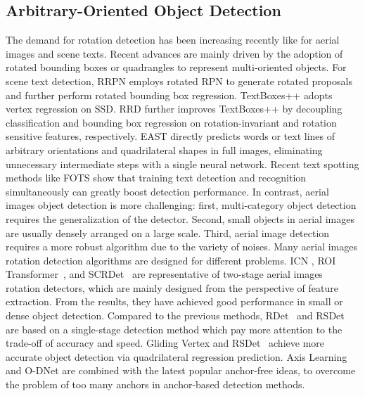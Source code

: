 \documentclass[10pt,journal,compsoc]{IEEEtran}
\begin{document}
\subsection{Arbitrary-Oriented Object Detection}
The demand for rotation detection has been increasing recently like for aerial images and scene texts. Recent advances are mainly driven by the adoption of rotated bounding boxes or quadrangles to represent multi-oriented objects. For scene text detection, RRPN \cite{ma2018arbitrary} employs rotated RPN to generate rotated proposals and further perform rotated bounding box regression. TextBoxes++ \cite{liao2018textboxes++} adopts vertex regression on SSD. RRD \cite{liao2018rotation}  further improves TextBoxes++ by decoupling classification and bounding box regression on rotation-invariant and rotation sensitive features, respectively. EAST \cite{zhou2017east} directly predicts words or text lines of arbitrary orientations and quadrilateral shapes in full images, eliminating unnecessary intermediate steps with a single neural network. Recent text spotting methods like FOTS \cite{liu2018fots} show that training text detection and recognition simultaneously can greatly boost detection performance. In contrast, aerial images object detection is more challenging: first, multi-category object detection requires the generalization of the detector. Second, small objects in aerial images are usually densely arranged on a large scale. Third, aerial image  detection requires a more robust algorithm due to the variety of noises. Many aerial images rotation detection algorithms are designed for different problems. ICN \cite{azimi2018towards}, ROI Transformer~\cite{ding2018learning}, and SCRDet~\cite{yang2019scrdet} are representative of two-stage aerial images rotation detectors, which are mainly designed from the perspective of feature extraction. From the results, they have achieved good performance in small or dense object detection. Compared to the previous methods, RDet~\cite{ yang2021r3det} and RSDet~\cite{qian2021learning} are based on a single-stage detection method which pay more attention to the trade-off of accuracy and speed. Gliding Vertex \cite{xu2020gliding} and RSDet~\cite{qian2021learning} achieve more accurate object detection via quadrilateral regression prediction. Axis Learning \cite{xiao2020axis} and O-DNet \cite{wei2020oriented} are combined with the latest popular anchor-free ideas, to overcome the problem of too many anchors in anchor-based detection methods.
\end{document}
